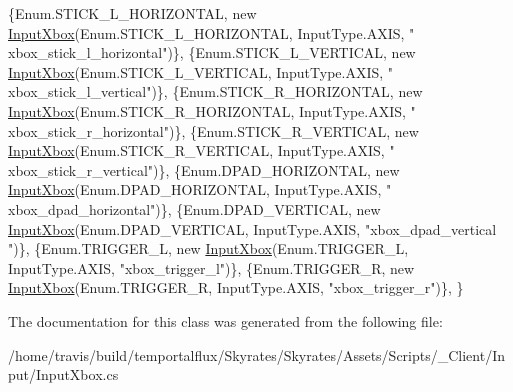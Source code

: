 \begin{DoxyCode}
        \{Enum.STICK\_L\_HORIZONTAL, \textcolor{keyword}{new} \hyperlink{class_input_xbox}{InputXbox}(Enum.STICK\_L\_HORIZONTAL, InputType.AXIS, \textcolor{stringliteral}{"
      xbox\_stick\_l\_horizontal"})\},
        \{Enum.STICK\_L\_VERTICAL, \textcolor{keyword}{new} \hyperlink{class_input_xbox}{InputXbox}(Enum.STICK\_L\_VERTICAL, InputType.AXIS, \textcolor{stringliteral}{"
      xbox\_stick\_l\_vertical"})\},
        \{Enum.STICK\_R\_HORIZONTAL, \textcolor{keyword}{new} \hyperlink{class_input_xbox}{InputXbox}(Enum.STICK\_R\_HORIZONTAL, InputType.AXIS, \textcolor{stringliteral}{"
      xbox\_stick\_r\_horizontal"})\},
        \{Enum.STICK\_R\_VERTICAL, \textcolor{keyword}{new} \hyperlink{class_input_xbox}{InputXbox}(Enum.STICK\_R\_VERTICAL, InputType.AXIS, \textcolor{stringliteral}{"
      xbox\_stick\_r\_vertical"})\},
        \{Enum.DPAD\_HORIZONTAL, \textcolor{keyword}{new} \hyperlink{class_input_xbox}{InputXbox}(Enum.DPAD\_HORIZONTAL, InputType.AXIS, \textcolor{stringliteral}{"
      xbox\_dpad\_horizontal"})\},
        \{Enum.DPAD\_VERTICAL, \textcolor{keyword}{new} \hyperlink{class_input_xbox}{InputXbox}(Enum.DPAD\_VERTICAL, InputType.AXIS, \textcolor{stringliteral}{"xbox\_dpad\_vertical
      "})\},
        \{Enum.TRIGGER\_L, \textcolor{keyword}{new} \hyperlink{class_input_xbox}{InputXbox}(Enum.TRIGGER\_L, InputType.AXIS, \textcolor{stringliteral}{"xbox\_trigger\_l"})\},
        \{Enum.TRIGGER\_R, \textcolor{keyword}{new} \hyperlink{class_input_xbox}{InputXbox}(Enum.TRIGGER\_R, InputType.AXIS, \textcolor{stringliteral}{"xbox\_trigger\_r"})\},
    \}
\end{DoxyCode}


The documentation for this class was generated from the following file\-:\begin{DoxyCompactItemize}
\item 
/home/travis/build/temportalflux/\-Skyrates/\-Skyrates/\-Assets/\-Scripts/\-\_\-\-Client/\-Input/Input\-Xbox.\-cs\end{DoxyCompactItemize}
